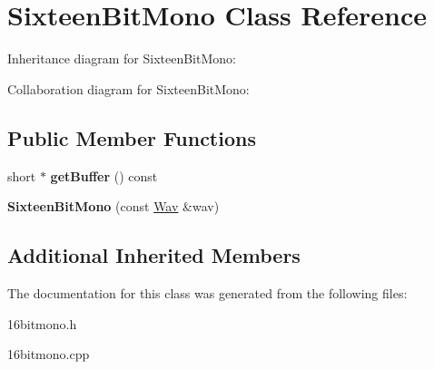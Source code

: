 \hypertarget{classSixteenBitMono}{}\section{Sixteen\+Bit\+Mono Class Reference}
\label{classSixteenBitMono}


Inheritance diagram for Sixteen\+Bit\+Mono\+:


Collaboration diagram for Sixteen\+Bit\+Mono\+:
\subsection*{Public Member Functions}
\begin{DoxyCompactItemize}
\item 
\mbox{\label{classSixteenBitMono_ae5ac457f6ab42ee169800d890b676415}} 
short $\ast$ {\bfseries get\+Buffer} () const
\item 
\mbox{\label{classSixteenBitMono_a2a234198df8a7729414ad40c68b1ee34}} 
{\bfseries Sixteen\+Bit\+Mono} (const \hyperlink{classWav}{Wav} \&wav)
\end{DoxyCompactItemize}
\subsection*{Additional Inherited Members}


The documentation for this class was generated from the following files\+:\begin{DoxyCompactItemize}
\item 
16bitmono.\+h\item 
16bitmono.\+cpp\end{DoxyCompactItemize}
